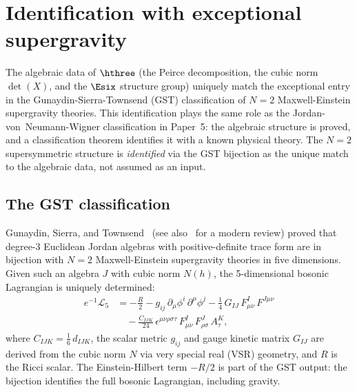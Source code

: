 
\section{Identification with exceptional supergravity}
\label{sec:identification}

The algebraic data of $\hthree$ (the Peirce decomposition, the cubic
norm $\det(X)$, and the $\Esix$ structure group) uniquely match the
exceptional entry in the Gunaydin-Sierra-Townsend (GST) classification
of $N{=}2$ Maxwell-Einstein supergravity theories. This identification
plays the same role as the Jordan-von~Neumann-Wigner classification in
Paper~5: the algebraic structure is proved, and a classification theorem
identifies it with a known physical theory. The $N{=}2$ supersymmetric
structure is \emph{identified} via the GST bijection as the unique match
to the algebraic data, not assumed as an input.

\subsection{The GST classification}

Gunaydin, Sierra, and Townsend~\cite{GST1983,GST1984} (see
also~\cite{Gunaydin2008} for a modern review) proved that
degree-3 Euclidean Jordan algebras with positive-definite trace form are
in bijection with $N{=}2$ Maxwell-Einstein supergravity theories in five
dimensions. Given such an algebra $J$ with cubic norm $N(h)$, the
5-dimensional bosonic Lagrangian is uniquely determined:
\begin{align}
\label{eq:5d-lagrangian}
e^{-1}\mathcal{L}_5 &= -\frac{R}{2}
  - g_{ij}\,\partial_\mu \phi^i\,\partial^\mu \phi^j
  - \tfrac{1}{4}\,G_{IJ}\,F^I_{\mu\nu}\,F^{J\mu\nu}
  \nonumber\\
  &\quad - \tfrac{C_{IJK}}{24}\,\epsilon^{\mu\nu\rho\sigma\tau}\,
    F^I_{\mu\nu}\,F^J_{\rho\sigma}\,A^K_\tau,
\end{align}
where $C_{IJK} = \frac{1}{6}\,d_{IJK}$, the scalar metric $g_{ij}$
and gauge kinetic matrix $G_{IJ}$ are derived from the cubic norm $N$
via very special real (VSR) geometry, and $R$ is the Ricci scalar. The
Einstein-Hilbert term $-R/2$ is part of the GST output: the bijection
identifies the full bosonic Lagrangian, including gravity.

